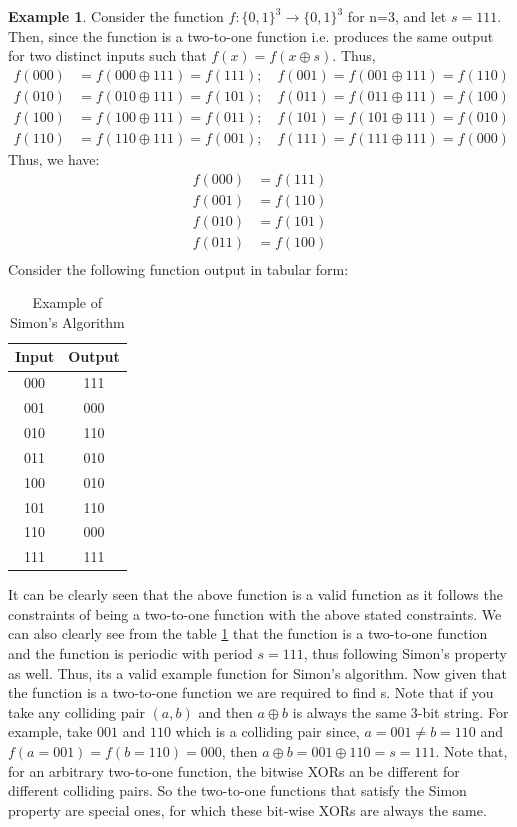 \documentclass[12pt, oneside]{book}
\theoremstyle{definition}
\theoremstyle{definition}
\newtheorem{example}{Example}[section]
\theoremstyle{remark}
\begin{document}
\begin{example}
    Consider the function $f:\{0,1\}^3 \rightarrow \{0,1\}^3$ for n=3, and let $s=111$. Then, since the function is a two-to-one function i.e. produces the same output for two distinct inputs such that 
    $f(x)=f(x\oplus s)$. Thus, 
    \begin{align*}
    f(000)&=f(000\oplus 111)=f(111); \quad f(001)=f(001\oplus 111)=f(110)\\ 
    f(010)&=f(010\oplus 111)=f(101); \quad f(011)=f(011\oplus 111)=f(100)\\ f(100)&=f(100\oplus 111)=f(011); \quad f(101)=f(101\oplus 111)=f(010) \\f(110)&=f(110\oplus 111)=f(001); \quad f(111)=f(111\oplus 111)=f(000)
    \end{align*}
    Thus, we have:
    \begin{align*}
        f(000)&=f(111) \\
        f(001)&=f(110) \\
        f(010)&=f(101) \\
        f(011)&=f(100) \\
    \end{align*}
    Consider the following function output in tabular form:
    \begin{table}[H]
        \centering
        \begin{tabular}{|c|c|}
            \hline
            Input & Output \\
            \hline
            000 & 111 \\
            001 & 000 \\
            010 & 110 \\
            011 & 010 \\
            100 & 010 \\
            101 & 110 \\
            110 & 000 \\
            111 & 111 \\
            \hline
        \end{tabular}
        \caption{Example of Simon's Algorithm}
        \label{tab:exsimon}
    \end{table}
    It can be clearly seen that the above function is a valid function as it follows the constraints of being a two-to-one function with the above stated constraints.
    We can also clearly see from the table \ref{tab:exsimon} that the function is a two-to-one function and the function is periodic with period $s=111$, thus following Simon's property as well.
    Thus, its a valid example function for Simon's algorithm.
    Now given that the function is a two-to-one function we are required to find s. Note that if you take any colliding pair $(a,b)$ and then $a \oplus b$ is always the same 3-bit string. For example, take $001$ and $110$ which is a colliding pair since, $a=001 \neq b=110$ and $f(a=001)=f(b=110)=000$, then $a\oplus b=001 \oplus 110 = s =111$. Note that, for an arbitrary two-to-one function, the bitwise XORs an be different for different colliding pairs. So the two-to-one functions that satisfy the Simon property are special ones, for which these bit-wise XORs are always the same.
\end{example}
\end{document}
